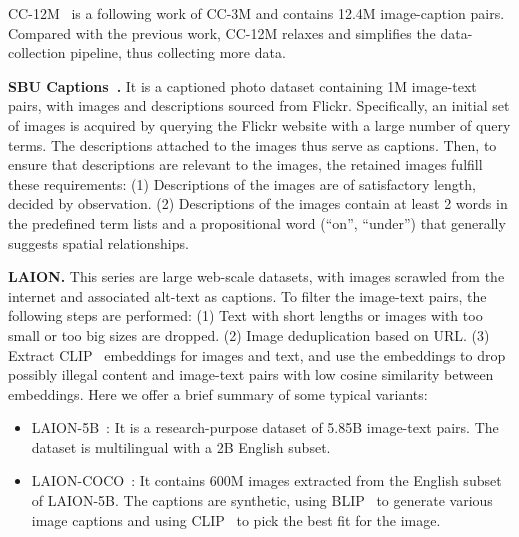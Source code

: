 CC-12M~\cite{CC-12m} is a following work of CC-3M and contains 12.4M image-caption pairs. Compared with the previous work, CC-12M relaxes and simplifies the data-collection pipeline, thus collecting more data.

\noindent \textbf{SBU Captions~\cite{SBU-Captions}.} 
It is a captioned photo dataset containing 1M image-text pairs, with images and descriptions sourced from Flickr. 
Specifically, an initial set of images is acquired by querying the Flickr website with a large number of query terms. The descriptions attached to the images thus serve as captions. Then, to ensure that descriptions are relevant to the images, the retained images fulfill these requirements: (1) Descriptions of the images are of satisfactory length, decided by observation. (2) Descriptions of the images contain at least 2 words in the predefined term lists and a propositional word (\eg ``on'', ``under'') that generally suggests spatial relationships.

\noindent \textbf{LAION.}
This series are large web-scale datasets, with images scrawled from the internet and associated alt-text as captions. To filter the image-text pairs, the following steps are performed: (1) Text with short lengths or images with too small or too big sizes are dropped. (2) Image deduplication based on URL. (3) Extract CLIP~\cite{clip} embeddings for images and text, and use the embeddings to drop possibly illegal content and image-text pairs with low cosine similarity between embeddings.
Here we offer a brief summary of some typical variants:
\begin{itemize}[leftmargin=*]
    \item LAION-5B~\cite{laion-5b}: It is a research-purpose dataset of 5.85B image-text pairs. The dataset is multilingual with a 2B English subset.
    \item LAION-COCO~\cite{laion-coco}: It contains 600M images extracted from the English subset of LAION-5B. The captions are synthetic, using BLIP~\cite{li2022blip} to generate various image captions and using CLIP~\cite{clip} to pick the best fit for the image.
\end{itemize}


